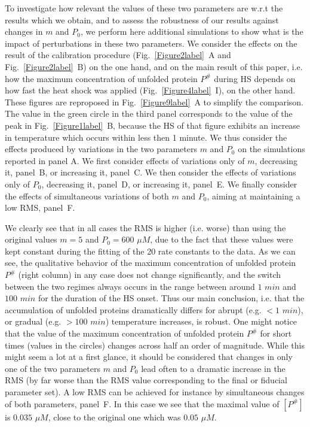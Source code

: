 \documentclass[oneside, 10pt, a4paper, twocolumn]{article}
\begin{document}
{To investigate how relevant the values of these two parameters are w.r.t the results which we obtain, and to assess the robustness of our results against changes in $m$ and $P_0$, we perform here additional simulations to show what is the impact of perturbations in these two parameters. We consider the effects on the result of the calibration procedure (Fig.~\ref{Figure2label}~A and Fig.~\ref{Figure2label}~B) on the one hand, and on the main result of this paper, i.e. how the maximum concentration of unfolded protein $P^\#$ during HS depends on how fast the heat shock was applied (Fig.~\ref{Figure4label}~I), on the other hand. These figures are reproposed in Fig.~\ref{Figure9label}~A to simplify the comparison. The value in the green circle in the third panel corresponds to the value of the peak in Fig.~\ref{Figure1label}~B, because the HS of that figure exhibits an increase in temperature which occurs within less then 1 minute. We thus consider the effects produced by variations in the two parameters $m$ and $P_0$ on the simulations reported in panel A. We first consider effects of variations only of $m$, decreasing it, panel~B, or increasing it, panel~C. We then consider the effects of variations only of $P_0$, decreasing it, panel~D, or increasing it, panel~E.
We finally consider the effects of simultaneous variations of both $m$ and $P_0$, aiming at maintaining a low RMS, panel~F.} 

{We clearly see that in all cases the RMS is higher (i.e. worse) than using the original values $m=5$ and $P_0=600$ $\mu M$, due to the fact that these values were kept constant during the fitting of the 20 rate constants to the data. 
As we can see, the qualitative behavior of the maximum concentration of unfolded protein $P^\#$ (right column) in any case does not change significantly, and the switch between the two regimes always occurs in the range between around $1$ $min$ and $100$ $min$ for the duration of the HS onset. Thus our main conclusion, i.e. that the accumulation of unfolded proteins dramatically differs for abrupt (e.g. $< 1$ $min$), or gradual (e.g. $> 100$ $min$) temperature increases, is robust.
One might notice that the value of the maximum concentration of unfolded protein $P^\#$  for short times (values in the circles) changes across half an order of magnitude. While this might seem a lot at a first glance, it should be considered that changes in only one of the two parameters $m$ and $P_0$ lead often to a dramatic increase in the RMS (by far worse than the RMS value corresponding to the final or fiducial parameter set). A low RMS can be achieved for instance by simultaneous changes of both parameters, panel~F. In this case we see that the maximal value of $[P^\#]$ is $0.035$ $\mu M$, close to the original one which was $0.05$ $\mu M$.} 
\end{document}
